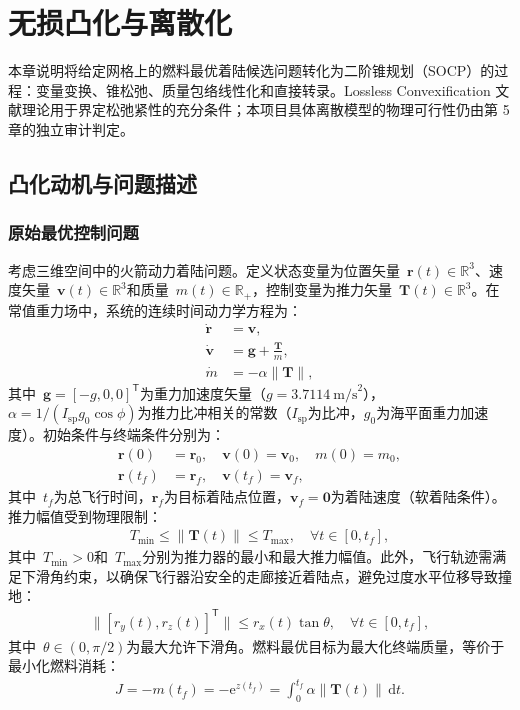 \section{无损凸化与离散化}\label{chap:convexification}\label{sec:convexification}

本章说明将给定网格上的燃料最优着陆候选问题转化为二阶锥规划（SOCP）的过程：变量变换、锥松弛、质量包络线性化和直接转录。Lossless Convexification 文献理论用于界定松弛紧性的充分条件；本项目具体离散模型的物理可行性仍由第 5 章的独立审计判定。

\subsection{凸化动机与问题描述}

\subsubsection{原始最优控制问题}

考虑三维空间中的火箭动力着陆问题。定义状态变量为位置矢量~$\bm r(t)\in\mathbb{R}^3$、速度矢量~$\bm v(t)\in\mathbb{R}^3$和质量~$m(t)\in\mathbb{R}_+$，控制变量为推力矢量~$\bm T(t)\in\mathbb{R}^3$。在常值重力场中，系统的连续时间动力学方程为：
\begin{align}
\dot{\bm r} &= \bm v,\label{eq:dyn_r}\\
\dot{\bm v} &= \bm g + \frac{\bm T}{m},\label{eq:dyn_v}\\
\dot m &= -\alpha\|\bm T\|,\label{eq:dyn_m}
\end{align}
其中~$\bm g=[-g,0,0]^{\mathsf T}$为重力加速度矢量（$g=3.7114~\text{m/s}^2$），$\alpha=1/(I_{\text{sp}}g_0\cos\phi)$为推力比冲相关的常数（$I_{\text{sp}}$为比冲，$g_0$为海平面重力加速度）。初始条件与终端条件分别为：
\begin{align}
\bm r(0) &=\bm r_0,\quad \bm v(0) =\bm v_0,\quad m(0)=m_0,\\
\bm r(t_f) &=\bm r_f,\quad \bm v(t_f)=\bm v_f,
\end{align}
其中~$t_f$为总飞行时间，$\bm r_f$为目标着陆点位置，$\bm v_f= \bm 0$为着陆速度（软着陆条件）。推力幅值受到物理限制：
\begin{align}
T_{\min} \le \|\bm T(t)\| \le T_{\max},\quad \forall t\in[0,t_f],
\end{align}
其中~$T_{\min}>0$和~$T_{\max}$分别为推力器的最小和最大推力幅值。此外，飞行轨迹需满足下滑角约束，以确保飞行器沿安全的走廊接近着陆点，避免过度水平位移导致撞地：
\begin{align}
\|[r_y(t), r_z(t)]^{\mathsf T}\| \le r_x(t)\tan\theta,\quad \forall t\in[0,t_f],
\end{align}
其中~$\theta\in(0,\pi/2)$为最大允许下滑角。燃料最优目标为最大化终端质量，等价于最小化燃料消耗：
\begin{align}
J = -m(t_f) = -\mathrm{e}^{z(t_f)} = \int_0^{t_f} \alpha\|\bm T(t)\|\,\mathrm{d}t.
\end{align}

